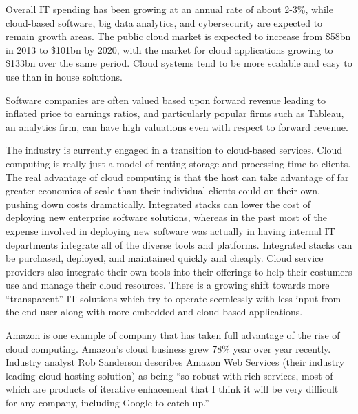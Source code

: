 Overall IT spending has been growing at an annual rate of about 2-3\%, while cloud-based software, big data analytics, and cybersecurity are expected to remain growth areas.\autocite[]{CloudAnalyticsCybersecurityApplication}\hspace{5mm}\autocite[]{CIOIntro}
The public cloud market is expected to increase from \$58bn in 2013 to \$101bn by 2020, with the market for cloud applications growing to \$133bn over the same period.\autocite[]{CIOIntro}
Cloud systems tend to be more scalable and easy to use than in house solutions.\autocite[]{CIOIntro}

Software companies are often valued based upon forward revenue leading to inflated price to earnings ratios, and particularly popular firms such as Tableau, an analytics firm, can have high valuations even with respect to forward revenue.\autocite[]{HorizontalPlaysTechnology}

The industry is currently engaged in a transition to cloud-based services.\autocite[39]{SurveysSoftware2015}
Cloud computing is really just a model of renting storage and processing time to clients.\autocite[]{AftermathOfIntegratedStack}
The real advantage of cloud computing is that the host can take advantage of far greater economies of scale than their individual clients could on their own, pushing down costs dramatically.\autocite[]{AftermathOfIntegratedStack}
Integrated stacks can lower the cost of deploying new enterprise software solutions, whereas in the past most of the expense involved in deploying new software was actually in having internal IT departments integrate all of the diverse tools and platforms.
Integrated stacks can be purchased, deployed, and maintained quickly and cheaply.\autocite[]{AftermathOfIntegratedStack}
Cloud service providers also integrate their own tools into their offerings to help their costumers use and manage their cloud resources.\autocite[]{AftermathOfIntegratedStack}
There is a growing shift towards more ``transparent'' IT solutions which try to operate seemlessly with less input from the end user along with more embedded and cloud-based applications.\autocite[]{OptimismInnovation}

Amazon is one example of company that has taken full advantage of the rise of cloud computing.
Amazon's cloud business grew 78\% year over year recently.\autocite[]{GoogleCloudBoost}
Industry analyst Rob Sanderson describes Amazon Web Services (their industry leading cloud hosting solution) as being ``so robust with rich services, most of which are products of iterative enhacement that I think it will be very difficult for any company, including Google to catch up.''\autocite[]{GoogleCloudBoost}

